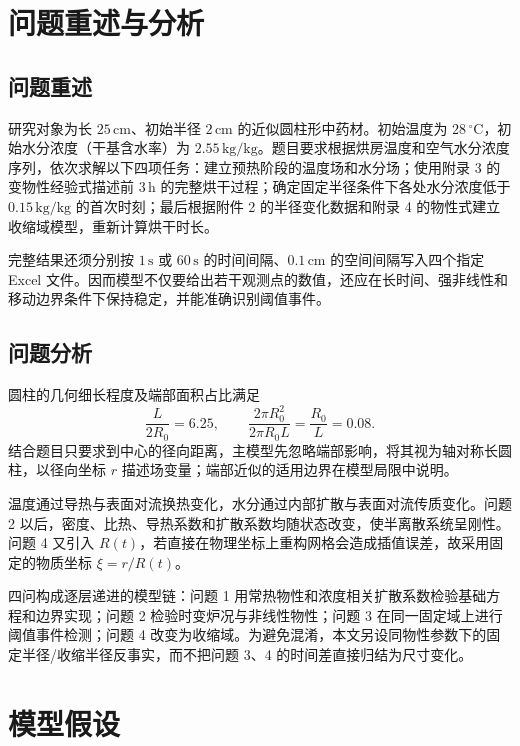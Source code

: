 \documentclass[UTF8,a4paper,zihao=-4,fontset=fandol]{ctexart}
\newcommand{\unit}[1]{\,\mathrm{#1}}
\begin{document}
\newpage
{}

\section{问题重述与分析}

\subsection{问题重述}

研究对象为长 $25\unit{cm}$、初始半径 $2\unit{cm}$ 的近似圆柱形中药材。初始温度为 $28\,^{\circ}\mathrm{C}$，初始水分浓度（干基含水率）为 $2.55\unit{kg/kg}$。题目要求根据烘房温度和空气水分浓度序列，依次求解以下四项任务：建立预热阶段的温度场和水分场；使用附录 3 的变物性经验式描述前 $3\unit{h}$ 的完整烘干过程；确定固定半径条件下各处水分浓度低于 $0.15\unit{kg/kg}$ 的首次时刻；最后根据附件 2 的半径变化数据和附录 4 的物性式建立收缩域模型，重新计算烘干时长。

完整结果还须分别按 $1\unit{s}$ 或 $60\unit{s}$ 的时间间隔、$0.1\unit{cm}$ 的空间间隔写入四个指定 Excel 文件。因而模型不仅要给出若干观测点的数值，还应在长时间、强非线性和移动边界条件下保持稳定，并能准确识别阈值事件。

\subsection{问题分析}

圆柱的几何细长程度及端部面积占比满足
\begin{equation}
\frac{L}{2R_0}=6.25,\qquad
\frac{2\pi R_0^2}{2\pi R_0L}=\frac{R_0}{L}=0.08.
\end{equation}
结合题目只要求到中心的径向距离，主模型先忽略端部影响，将其视为轴对称长圆柱，以径向坐标 $r$ 描述场变量；端部近似的适用边界在模型局限中说明。

温度通过导热与表面对流换热变化，水分通过内部扩散与表面对流传质变化。问题 2 以后，密度、比热、导热系数和扩散系数均随状态改变，使半离散系统呈刚性。问题 4 又引入 $R(t)$，若直接在物理坐标上重构网格会造成插值误差，故采用固定的物质坐标 $\xi=r/R(t)$。

四问构成逐层递进的模型链：问题 1 用常热物性和浓度相关扩散系数检验基础方程和边界实现；问题 2 检验时变炉况与非线性物性；问题 3 在同一固定域上进行阈值事件检测；问题 4 改变为收缩域。为避免混淆，本文另设同物性参数下的固定半径/收缩半径反事实，而不把问题 3、4 的时间差直接归结为尺寸变化。

\section{模型假设}
\end{document}
